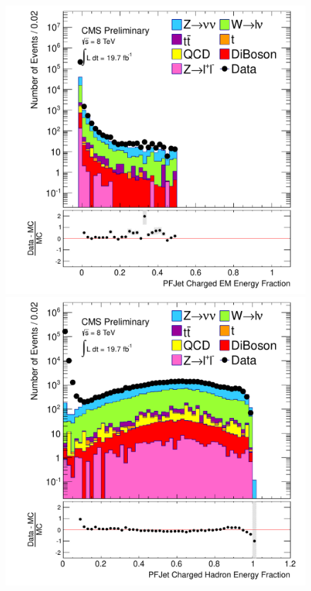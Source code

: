 \begin{figure}[!Hhtb]%
  \begin{center}
  \includegraphics[scale=0.31]     {Figures/sus13009/nocut/prelimLabels/PFAK5JetChaEmEngFrac.pdf}
  \includegraphics[scale=0.31]     {Figures/sus13009/nocut/prelimLabels/PFAK5JetChaHadEngFrac.pdf}

\end{center}
\end{figure}
